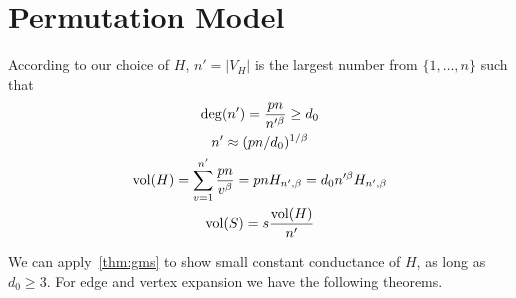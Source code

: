 \section{Permutation Model}

According to our choice of $H$, $n'=|V_H|$ is the largest number from $\{1,\ldots,n\}$ such that
\begin{gather}
    \deg(n')=\frac{pn}{n'^\beta}\geq d_0\\
    n'\approx(pn/d_0)^{1/\beta}\\
    \operatorname*{vol}(H)=\sum_{v=1}^{n'}{\frac{pn}{v^\beta}}=pnH_{n',\beta}=d_0n'^\beta H_{n',\beta}\\
    \operatorname*{vol}(S)=s\frac{\operatorname*{vol}(H)}{n'}
\end{gather}

We can apply~\autoref{thm:gms} to show small constant conductance of $H$,
as long as $d_0\geq 3$. For edge and vertex expansion we have the following theorems.

